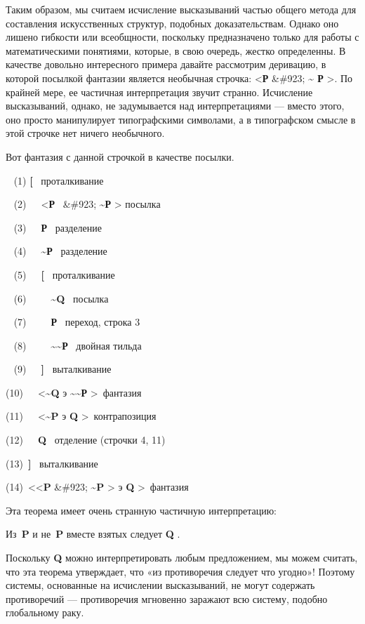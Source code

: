 Таким образом, мы считаем исчисление высказываний частью общего метода для составления искусственных структур, подобных доказательствам. Однако оно лишено гибкости или всеобщности, поскольку предназначено только для работы с математическими понятиями, которые, в свою очередь, жестко определенны. В качестве довольно интересного примера давайте рассмотрим деривацию, в которой посылкой фантазии является необычная строчка: \textless{}\textbf{Р} \&\#923; \textbf{\textasciitilde{} Р} \textgreater. По крайней мере, ее частичная интерпретация звучит странно. Исчисление высказываний, однако, не задумывается над интерпретациями --- вместо этого, оно просто манипулирует типографскими символами, а в типографском смысле в этой строчке нет ничего необычного.

Вот фантазия с данной строчкой в качестве посылки.

~ (1) \textbf{{[}} ~проталкивание

~ (2)~~~\textless{}\textbf{Р} ~\&\#923; \textbf{\textasciitilde Р} \textgreater{} посылка

~ (3)~~~\textbf{Р} ~разделение

~ (4)~~~\textbf{\textasciitilde Р} ~разделение

~ (5)~~~\textbf{{[}} ~проталкивание

~ (6)~~~~~\textbf{\textasciitilde Q} ~посылка

~ (7)~~~~~\textbf{Р} ~переход, строка 3

~ (8)~~~~~\textbf{\textasciitilde\textasciitilde Р} ~двойная тильда

~ (9)~~~\textbf{{]}} ~выталкивание

(10)~~~\textless{}\textbf{\textasciitilde Q} э \textbf{\textasciitilde\textasciitilde Р} \textgreater~фантазия

(11)~~~\textless{}\textbf{\textasciitilde P} э \textbf{Q} \textgreater~контрапозиция

(12)~~~\textbf{Q} ~отделение (строчки 4, 11)

(13)~\textbf{{]}} ~выталкивание

(14)~\textless\textless{}\textbf{P} \&\#923; \textbf{\textasciitilde P} \textgreater{} э \textbf{Q} \textgreater~фантазия

Эта теорема имеет очень странную частичную интерпретацию:

Из~\textbf{P} и не~\textbf{P} вместе взятых следует \textbf{Q} .

Поскольку \textbf{Q} можно интерпретировать любым предложением, мы можем считать, что эта теорема утверждает, что «из противоречия следует что угодно»! Поэтому системы, основанные на исчислении высказываний, не могут содержать противоречий --- противоречия мгновенно заражают всю систему, подобно глобальному раку.

